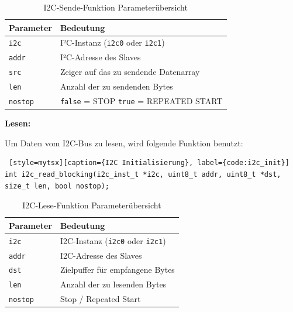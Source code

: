 \begin{inhalt}
\begin{table}[H]
\centering
\renewcommand{\arraystretch}{1.3}
\begin{tabular}{|l|p{10cm}|}
\hline
\rowcolor{cyan!20}
\textbf{Parameter} & \textbf{Bedeutung} \\
\hline
\texttt{i2c} & I²C-Instanz (\texttt{i2c0} oder \texttt{i2c1}) \\
\hline
\texttt{addr} & I²C-Adresse des Slaves \\
\hline
\texttt{src} & Zeiger auf das zu sendende Datenarray \\
\hline
\texttt{len} & Anzahl der zu sendenden Bytes \\
\hline
\texttt{nostop} & \texttt{false} = STOP \newline
\texttt{true} = REPEATED START \\
\hline
\end{tabular}
\caption{I2C-Sende-Funktion Parameterübersicht}
\label{tab:i2c_parameter}
\end{table}




\textbf{Lesen:}

Um Daten vom I2C-Bus zu lesen, wird folgende Funktion benutzt:

\begin{lstlisting} [style=mytsx][caption={I2C Initialisierung}, label={code:i2c_init}]
int i2c_read_blocking(i2c_inst_t *i2c, uint8_t addr, uint8_t *dst, size_t len, bool nostop);
\end{lstlisting}

\begin{table}[H]
\centering
\renewcommand{\arraystretch}{1.3}
\begin{tabular}{|l|p{10cm}|}
\hline
\rowcolor{cyan!20}
\textbf{Parameter} & \textbf{Bedeutung} \\
\hline
\texttt{i2c} & I2C-Instanz (\texttt{i2c0} oder \texttt{i2c1}) \\
\hline
\texttt{addr} & I2C-Adresse des Slaves \\
\hline
\texttt{dst} & Zielpuffer für empfangene Bytes \\
\hline
\texttt{len} & Anzahl der zu lesenden Bytes \\
\hline
\texttt{nostop} & Stop / Repeated Start \\
\hline
\end{tabular}
\caption{I2C-Lese-Funktion Parameterübersicht}
\label{tab:i2c_read_parameters}
\end{table}


\end{inhalt}
